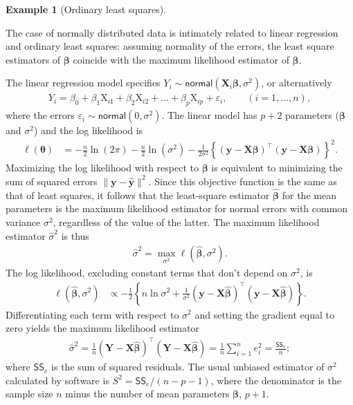 \documentclass[
  11pt,
  letterpaper,
]{scrbook}
\theoremstyle{plain}
\theoremstyle{definition}
\newtheorem{example}{Example}[chapter]
\theoremstyle{definition}
\theoremstyle{remark}
\begin{document}
\begin{example}[Ordinary least
squares]\protect\hypertarget{exm-ols-mle}{}\label{exm-ols-mle}

The case of normally distributed data is intimately related to linear
regression and ordinary least squares: assuming normality of the errors,
the least square estimators of \(\boldsymbol{\beta}\) coincide with the
maximum likelihood estimator of \(\boldsymbol{\beta}\).

The linear regression model specifies
\(Y_i \sim \mathsf{normal}(\mathbf{X}_i\boldsymbol{\beta}, \sigma^2)\),
or alternatively \begin{align*}
Y_i=\beta_0+\beta_1 \mathrm{X}_{i1}+\beta_2 \mathrm{X}_{i2}+\ldots +\beta_p \mathrm{X}_{ip} + \varepsilon_i, \qquad  (i=1, \ldots, n),
\end{align*} where the errors
\(\varepsilon_i \sim \mathsf{normal}(0, \sigma^2)\). The linear model
has \(p+2\) parameters (\(\boldsymbol{\beta}\) and \(\sigma^2\)) and the
log likelihood is \begin{align*}
\ell(\boldsymbol{\theta})&=-\frac{n}{2} \ln(2\pi)-\frac{n}{2} \ln (\sigma^2) -\frac{1}{2\sigma^2}\left\{(\boldsymbol{y}-\mathbf{X}\boldsymbol{\beta})^\top(\boldsymbol{y}-\mathbf{X}\boldsymbol{\beta})\right\}^2.
\end{align*} Maximizing the log likelihood with respect to
\(\boldsymbol{\beta}\) is equivalent to minimizing the sum of squared
errors \(\|\boldsymbol{y} - \widehat{\boldsymbol{y}}\|^2\). Since this
objective function is the same as that of least squares, it follows that
the least-square estimator \(\widehat{\boldsymbol{\beta}}\) for the mean
parameters is the maximum likelihood estimator for normal errors with
common variance \(\sigma^2\), regardless of the value of the latter. The
maximum likelihood estimator \(\widehat{\sigma}^2\) is thus
\begin{align*}
\widehat{\sigma}^2=\max_{\sigma^2} \ell(\widehat{\boldsymbol{\beta}}, \sigma^2).
\end{align*} The log likelihood, excluding constant terms that don't
depend on \(\sigma^2\), is \begin{align*}
\ell(\widehat{\boldsymbol{\beta}}, \sigma^2)
&\propto-\frac{1}{2}\left\{n\ln\sigma^2+\frac{1}{\sigma^2}(\boldsymbol{y}-\mathbf{X}\hat{\boldsymbol{\beta}})^\top(\boldsymbol{y}-\mathbf{X}\hat{\boldsymbol{\beta}})\right\}.
\end{align*} Differentiating each term with respect to \(\sigma^2\) and
setting the gradient equal to zero yields the maximum likelihood
estimator \begin{align*}
\widehat{\sigma}^2=\frac{1}{n}(\boldsymbol{Y}-\mathbf{X}\hat{\boldsymbol{\beta}})^\top(\boldsymbol{Y}-\mathbf{X}\hat{\boldsymbol{\beta}})= \frac{1}{n} \sum_{i=1}^n e_i^2= \frac{\mathsf{SS}_e}{n};
\end{align*} where \(\mathsf{SS}_e\) is the sum of squared residuals.
The usual unbiased estimator of \(\sigma^2\) calculated by software is
\(S^2=\mathsf{SS}_e/(n-p-1)\), where the denominator is the sample size
\(n\) minus the number of mean parameters \(\boldsymbol{\beta}\),
\(p+1\).

\end{example}
\end{document}
